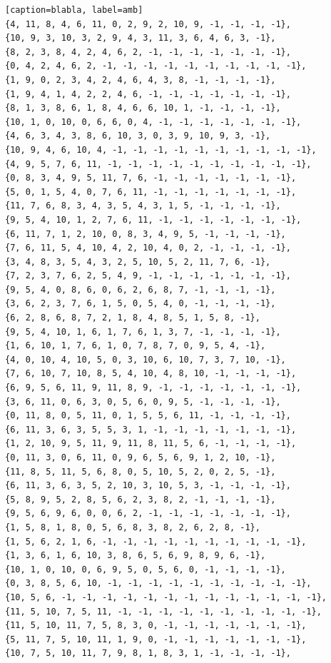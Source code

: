 \documentclass[12pt]{article}
\begin{document}
\begin{lstlisting}[frame=single, basicstyle=\scriptsize][caption=blabla, label=amb]
{4, 11, 8, 4, 6, 11, 0, 2, 9, 2, 10, 9, -1, -1, -1, -1},
{10, 9, 3, 10, 3, 2, 9, 4, 3, 11, 3, 6, 4, 6, 3, -1},
{8, 2, 3, 8, 4, 2, 4, 6, 2, -1, -1, -1, -1, -1, -1, -1},
{0, 4, 2, 4, 6, 2, -1, -1, -1, -1, -1, -1, -1, -1, -1, -1},
{1, 9, 0, 2, 3, 4, 2, 4, 6, 4, 3, 8, -1, -1, -1, -1},
{1, 9, 4, 1, 4, 2, 2, 4, 6, -1, -1, -1, -1, -1, -1, -1},
{8, 1, 3, 8, 6, 1, 8, 4, 6, 6, 10, 1, -1, -1, -1, -1},
{10, 1, 0, 10, 0, 6, 6, 0, 4, -1, -1, -1, -1, -1, -1, -1},
{4, 6, 3, 4, 3, 8, 6, 10, 3, 0, 3, 9, 10, 9, 3, -1},
{10, 9, 4, 6, 10, 4, -1, -1, -1, -1, -1, -1, -1, -1, -1, -1},
{4, 9, 5, 7, 6, 11, -1, -1, -1, -1, -1, -1, -1, -1, -1, -1},
{0, 8, 3, 4, 9, 5, 11, 7, 6, -1, -1, -1, -1, -1, -1, -1},
{5, 0, 1, 5, 4, 0, 7, 6, 11, -1, -1, -1, -1, -1, -1, -1},
{11, 7, 6, 8, 3, 4, 3, 5, 4, 3, 1, 5, -1, -1, -1, -1},
{9, 5, 4, 10, 1, 2, 7, 6, 11, -1, -1, -1, -1, -1, -1, -1},
{6, 11, 7, 1, 2, 10, 0, 8, 3, 4, 9, 5, -1, -1, -1, -1},
{7, 6, 11, 5, 4, 10, 4, 2, 10, 4, 0, 2, -1, -1, -1, -1},
{3, 4, 8, 3, 5, 4, 3, 2, 5, 10, 5, 2, 11, 7, 6, -1},
{7, 2, 3, 7, 6, 2, 5, 4, 9, -1, -1, -1, -1, -1, -1, -1},
{9, 5, 4, 0, 8, 6, 0, 6, 2, 6, 8, 7, -1, -1, -1, -1},
{3, 6, 2, 3, 7, 6, 1, 5, 0, 5, 4, 0, -1, -1, -1, -1},
{6, 2, 8, 6, 8, 7, 2, 1, 8, 4, 8, 5, 1, 5, 8, -1},
{9, 5, 4, 10, 1, 6, 1, 7, 6, 1, 3, 7, -1, -1, -1, -1},
{1, 6, 10, 1, 7, 6, 1, 0, 7, 8, 7, 0, 9, 5, 4, -1},
{4, 0, 10, 4, 10, 5, 0, 3, 10, 6, 10, 7, 3, 7, 10, -1},
{7, 6, 10, 7, 10, 8, 5, 4, 10, 4, 8, 10, -1, -1, -1, -1},
{6, 9, 5, 6, 11, 9, 11, 8, 9, -1, -1, -1, -1, -1, -1, -1},
{3, 6, 11, 0, 6, 3, 0, 5, 6, 0, 9, 5, -1, -1, -1, -1},
{0, 11, 8, 0, 5, 11, 0, 1, 5, 5, 6, 11, -1, -1, -1, -1},
{6, 11, 3, 6, 3, 5, 5, 3, 1, -1, -1, -1, -1, -1, -1, -1},
{1, 2, 10, 9, 5, 11, 9, 11, 8, 11, 5, 6, -1, -1, -1, -1},
{0, 11, 3, 0, 6, 11, 0, 9, 6, 5, 6, 9, 1, 2, 10, -1},
{11, 8, 5, 11, 5, 6, 8, 0, 5, 10, 5, 2, 0, 2, 5, -1},
{6, 11, 3, 6, 3, 5, 2, 10, 3, 10, 5, 3, -1, -1, -1, -1},
{5, 8, 9, 5, 2, 8, 5, 6, 2, 3, 8, 2, -1, -1, -1, -1},
{9, 5, 6, 9, 6, 0, 0, 6, 2, -1, -1, -1, -1, -1, -1, -1},
{1, 5, 8, 1, 8, 0, 5, 6, 8, 3, 8, 2, 6, 2, 8, -1},
{1, 5, 6, 2, 1, 6, -1, -1, -1, -1, -1, -1, -1, -1, -1, -1},
{1, 3, 6, 1, 6, 10, 3, 8, 6, 5, 6, 9, 8, 9, 6, -1},
{10, 1, 0, 10, 0, 6, 9, 5, 0, 5, 6, 0, -1, -1, -1, -1},
{0, 3, 8, 5, 6, 10, -1, -1, -1, -1, -1, -1, -1, -1, -1, -1},
{10, 5, 6, -1, -1, -1, -1, -1, -1, -1, -1, -1, -1, -1, -1, -1},
{11, 5, 10, 7, 5, 11, -1, -1, -1, -1, -1, -1, -1, -1, -1, -1},
{11, 5, 10, 11, 7, 5, 8, 3, 0, -1, -1, -1, -1, -1, -1, -1},
{5, 11, 7, 5, 10, 11, 1, 9, 0, -1, -1, -1, -1, -1, -1, -1},
{10, 7, 5, 10, 11, 7, 9, 8, 1, 8, 3, 1, -1, -1, -1, -1},

\end{lstlisting}
\end{document}
